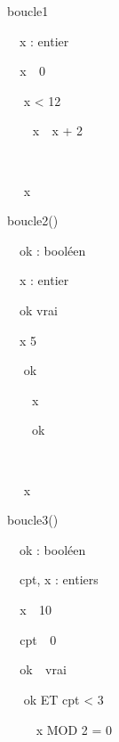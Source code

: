 {\sffamily
{} boucle1\textstyleMotCl{\textmd{()}}}

{\sffamily
\ \ x : entier}

{\sffamily
\texttt{\ \ }x\texttt{
}\texttt{ }0}

{\sffamily
\ \  x {\textless} 12 }

{\sffamily
\texttt{\ \ \ \ }x\texttt{
}\texttt{ }x + 2}

{\sffamily
\ \ }

{\sffamily
\ \  x}

{\sffamily
{} }


\bigskip

{\sffamily
{} boucle2()}

{\sffamily
\ \ ok : booléen}

{\sffamily
\ \ x : entier}

{\sffamily
\ \ ok  vrai}

{\sffamily
\ \ x  5}

{\sffamily
\ \  ok }

{\sffamily
{\ \ \ \ x
}}

{\sffamily
{\ \ \ \ ok
}}

{\sffamily
\ \ }

{\sffamily
\ \  x}

{\sffamily
{} }


\bigskip

{\sffamily
{} boucle3()}

{\sffamily
\ \ ok : booléen}

{\sffamily
\ \ cpt, x : entiers}

{\sffamily
\texttt{\ \ }x\texttt{
}\texttt{ }10}

{\sffamily
\texttt{\ \ }cpt\texttt{
}\texttt{ }0}

{\sffamily
\texttt{\ \ }ok\texttt{
}\texttt{ }vrai}

{\sffamily
\ \  ok ET cpt {\textless} 3
}

{\sffamily
\ \ \ \  x MOD 2 = 0 }

